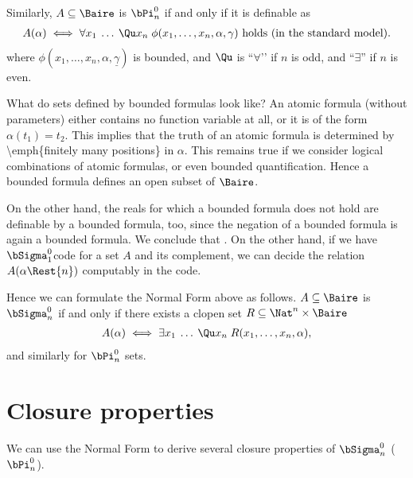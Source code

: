 \documentclass[letterpaper,10pt,english]{jupyterBook}
\begin{document}
\sphinxAtStartPar
Similarly, \(A \subseteq \Baire\) is \(\bPi^0_n\) if and only if it is definable as
\begin{equation*}
\begin{split}
	A(\alpha) \iff \forall x_1 \: \dots \:  \Qu x_n \; \phi(x_1, \dots, x_n, \alpha,\gamma) \text{ holds (in the standard model).}
\end{split}
\end{equation*}
\sphinxAtStartPar
where \(\phi(x_1, \dots, x_n,\alpha,\underline{\gamma})\) is bounded, and \(\Qu\) is ``\(\forall\)’’ if \(n\) is odd, and “\(\exists\)” if \(n\) is even.

\sphinxAtStartPar
What do sets defined by bounded formulas look like? An atomic formula (without parameters) either contains no function variable at all, or it is of the form \(\alpha(t_1) = t_2\). This implies that the truth of an atomic formula is determined by \textbackslash{}emph\{finitely many positions\} in \(\alpha\). This remains true if we consider logical combinations of atomic formulas, or even bounded quantification. Hence a bounded formula defines an open subset of \(\Baire\).

\sphinxAtStartPar
On the other hand, the reals for which a bounded formula does not hold are definable by a bounded formula, too, since the negation of a bounded formula is again a bounded formula. We conclude that . On the other hand, if we have \(\bSigma^0_1\)\sphinxhyphen{}code for a set \(A\) and its complement, we can decide the relation \(A(\alpha\Rest{n})\) computably in the code.

\sphinxAtStartPar
Hence we can formulate the Normal Form above as follows.
\(A \subseteq \Baire\) is \(\bSigma^0_n\) if and only if there exists a clopen set \(R \subseteq \Nat^n\times \Baire\)
\begin{equation*}
\begin{split}
	A(\alpha) \iff \exists x_1 \: \dots \: \Qu x_n \; R(x_1, \dots, x_n, \alpha),
\end{split}
\end{equation*}
\sphinxAtStartPar
and similarly for \(\bPi^0_n\) sets.


\section{Closure properties}
\label{\detokenize{structureBorel:closure-properties}}
\sphinxAtStartPar
We can use the Normal Form to derive several closure properties of \(\bSigma^0_n\) (\(\bPi^0_n\)).
\end{document}
